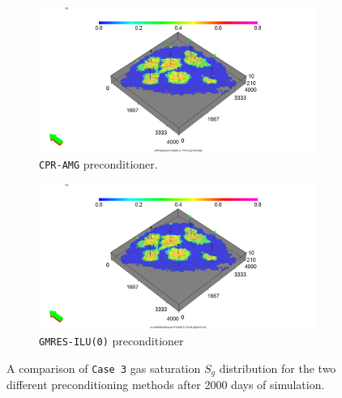 \begin{figure}
\centering
\begin{subfigure}{.5\textwidth}
  \centering
  \includegraphics[width=1.3\linewidth]{figures/case3_cpr_sgas.png}
  \caption{\texttt{CPR-AMG} preconditioner.}
\end{subfigure}%
\begin{subfigure}{.5\textwidth}
  \centering
  \includegraphics[width=1.3\linewidth]{figures/case3_ilu_sgas.png}
  \caption{\texttt{GMRES-ILU(0)} preconditioner}
\end{subfigure}
\caption{A comparison of \texttt{Case 3} gas saturation $S_{g}$ distribution for the two different preconditioning methods after 2000 days of simulation.}
\label{case1sg}
\end{figure}

